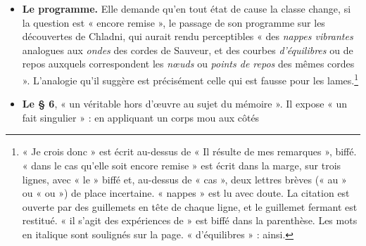 \documentclass[11pt,a4paper]{article}
\begin{document}
\begin{itemize}
    de ces corps sonores ». Elle résulte, pour la lame, de la théorie
    d'Euler, du travail de Ricati, et de l'expérience. Avec des lames assez
    longues, l'expérience montre entre les lignes de repos des intervalles
    « sensiblement inégaux », conformes à la théorie d'Euler, ce que Chladni,
    qui s'est « sans doute » servi de lames trop courtes, n'a pas
    mentionné.\footnote{« Ricati » : ainsi. La page se termine sur « enfin
    de », et la phrase continue au verso. Un mot biffé, « un » ou « en »,
    précède « servi ».} Chez la corde, le nœud de Sauveur est « une véritable
    limite analytique » : si l'on coupait la corde en son nœud, chaque moitié
    vibrerait comme avant. Chez la lame, dans « le plus grand nombre » des
    cas, les parties séparées par des points de repos ne pourraient, isolées,
    ni se ployer aux mêmes courbures ni rendre les mêmes sons. C'est juste,
    et c'est bien affaire d'ordre. Pour l'équation de la corde, qui est du
    second ordre, un nœud (\(z=0\)) est exactement la condition d'extrémité
    fixe. Pour l'équation de la lame, qui est du quatrième ordre, le moment
    \(z''\) et l'effort tranchant \(z'''\) ne s'annulent pas en général en un
    nœud. La partie isolée ne satisferait donc ni aux conditions d'un bord
    appuyé ni à celles d'un bord libre.
  \item \textbf{Le programme.} Elle demande qu'en tout état de cause la
    classe change, si la question est « encore remise », le passage de son
    programme sur les découvertes de Chladni, qui aurait rendu perceptibles
    « des \emph{nappes vibrantes} analogues aux \emph{ondes} des cordes de
    Sauveur, et des courbes \emph{d'équilibres} ou de repos auxquels
    correspondent les \emph{nœuds} ou \emph{points de repos} des mêmes
    cordes ». L'analogie qu'il suggère est précisément celle qui est fausse
    pour les lames.\footnote{« Je crois donc » est écrit au-dessus de « Il
    résulte de mes remarques », biffé. « dans le cas qu'elle soit encore
    remise » est écrit dans la marge, sur trois lignes, avec « le » biffé et,
    au-dessus de « cas », deux lettres brèves (« au » ou « ou ») de place
    incertaine. « nappes » est lu avec doute. La citation est ouverte par des
    guillemets en tête de chaque ligne, et le guillemet fermant est restitué.
    « il s'agit des expériences de » est biffé dans la parenthèse. Les mots
    en italique sont soulignés sur la page. « d'équilibres » : ainsi.}
  \item \textbf{Le § 6}, « un véritable hors d'œuvre au sujet du mémoire ».
    Il expose « un fait singulier » : en appliquant un corps mou aux côtés

\end{itemize}
\end{document}
